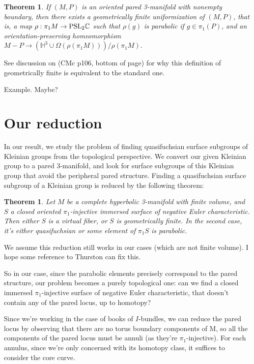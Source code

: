 \documentclass[12pt]{amsart}
\newtheorem{thm}[theorem]{Theorem}
\theoremstyle{definition}
\newcommand{\Om}{\Omega}
\newcommand{\PSL}{\mbox{\rm{PSL}}}
\begin{document}
\begin{thm}

If $(M,P)$ is an oriented pared 3-manifold with nonempty boundary, then
there exists a geometrically finite uniformization of $(M,P)$, that is, a map
$\rho: \pi_1M \to \PSL_2\mathbb{C}$ such that $\rho(g)$ is parabolic if $g \in
\pi_1(P)$, and an
orientation-preserving homeomorphism $M-P \to \left(\mathbb{H}^3
\cup \Om(\rho(\pi_1M))\right)/\rho(\pi_1M)$.

\end{thm}

See discussion on (CMc p106, bottom of page) for why this definition of
geometrically finite is equivalent to the standard one.

Example. Maybe? %

\section{Our reduction}

In our result, we study the problem of finding quasifuchsian surface subgroups
of Kleinian groups from the topological perspective. We convert our given
Kleinian group to a pared 3-manifold, and look for surface subgroups of this
Kleinian group that avoid the peripheral pared structure. Finding
a quasifuchsian surface subgroup of a Kleinian group is reduced by the
following theorem:

\begin{thm}

Let $M$ be a complete hyperbolic 3-manifold with finite volume, and $S$
a closed oriented $\pi_1$-injective immersed surface of negative Euler
characteristic. Then either $S$ is a virtual fiber, or $S$ is geometrically
finite. In the second case, it's either quasifuchsian or some element of
$\pi_1S$ is parabolic.

\end{thm}

We assume this reduction still works in our cases (which are not finite
volume). I hope some reference to Thurston can fix this.

So in our case, since the parabolic elements precisely correspond to the pared
structure, our problem becomes a purely topological one: can we find a closed
immersed $\pi_1$-injective surface of negative Euler characteristic, that
doesn't contain any of the pared locus, up to homotopy?

Since we're working in the case of books of $I$-bundles, we can reduce the pared
locus by observing that there are no torus boundary components of M, so all the
components of the pared locus must be annuli (as they're $\pi_1$-injective). For
each annulus, since we're only concerned with its homotopy class, it suffices
to consider the core curve.
\end{document}
